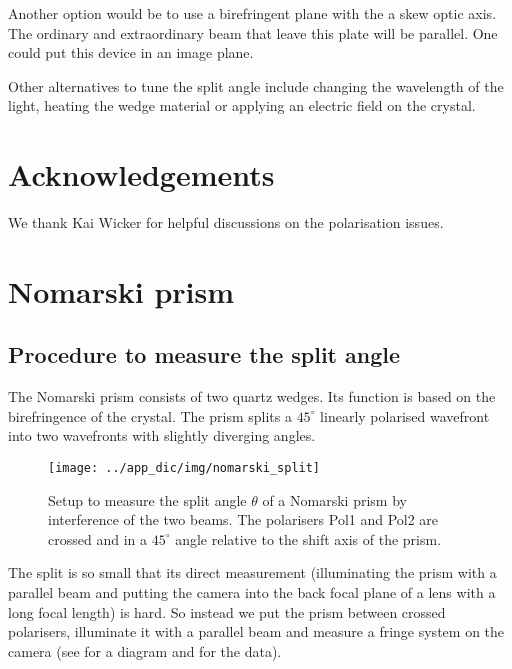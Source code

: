 Another option would be to use a birefringent plane with the a skew
optic axis. The ordinary and extraordinary beam that leave this plate
will be parallel. One could put this device in an image
plane. %

Other alternatives to tune the split angle include changing the
wavelength of the light, heating the wedge material or applying an
electric field on the crystal.

\section{Acknowledgements}
We thank Kai Wicker for helpful discussions on the polarisation
issues.

\section{Nomarski prism}
\subsection{Procedure to measure the split angle}
\label{sec:prism}
The Nomarski prism consists of two quartz wedges. Its function is
based on the birefringence of the crystal. The prism splits a
$45^\circ$ linearly polarised wavefront into two wavefronts with
slightly diverging angles.
\begin{figure}[htb]
  \centering
  \texttt{[image: ../app\_dic/img/nomarski\_split]}
  \caption{Setup to measure the split angle $\theta$ of a Nomarski
    prism by interference of the two beams. The polarisers Pol1 and
    Pol2 are crossed and in a $45^\circ$ angle relative to the shift
    axis of the prism.}
  \label{fig:nomarski_split}
\end{figure}
The split is so small that its direct measurement (illuminating the
prism with a parallel beam and putting the camera into the back focal
plane of a lens with a long focal length) is hard.  So instead we put
the prism between crossed polarisers, illuminate it with a parallel
beam and measure a fringe system on the camera (see
for a diagram and
for the data).

